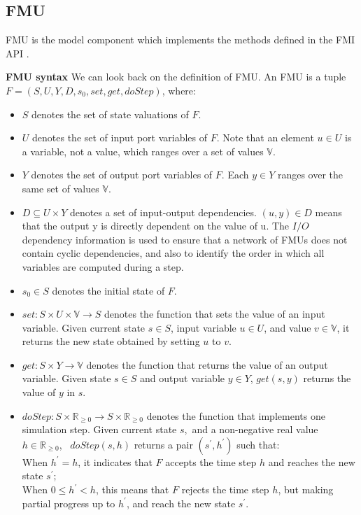 \subsection{FMU}
FMU is the model component which implements the methods defined in the FMI API \cite{Tripakis15}.
\begin{definition}
\textbf{FMU syntax}
We can look back on the definition of FMU. An FMU is a tuple $F=(S,U,Y,D,s_{0},set,get,doStep)$, where:
\end{definition}
\begin{itemize}
\item
$S$ denotes the set of state valuations of $F$. 
\item
$U$ denotes the set of input port variables of $F$. Note that an element $u \in U$ is a variable, not a value, which ranges over a set of values $\mathbb{V}$. 
\item
$Y$ denotes the set of output port variables of $F$. Each $y \in Y$ ranges over the same set of values $\mathbb{V}$.
\item
$D \subseteq U \times Y$ denotes a set of input-output dependencies. $(u,y) \in D $ means that the output y is directly dependent on the value of u. The $I/O$ dependency information is used to ensure that a network of FMUs does not contain cyclic dependencies, and also to identify the order in which all variables are computed during a step.
\item
$s_{0} \in S$ denotes the initial state of $F$.
\item
$set : S \times U \times \mathbb{V} \rightarrow S$ denotes the function that sets the value of an input variable. Given current state $s \in S$, input variable $u \in U$, and value $v \in \mathbb{V}$, it returns the new state obtained by setting $u$ to $v$.
\item
$get : S \times Y \rightarrow \mathbb{V}$ denotes the function that returns the value of an output variable. Given state $s \in S$ and output variable $y \in Y$, $get(s,y)$ returns the value of $y$ in $s$.
\item
$doStep : S \times \mathbb{R}_{\geqslant{0}} \rightarrow S \times \mathbb{R}_{\geqslant{0}}$ denotes the function that implements one simulation step. Given current state $s$,~and a non-negative real value $h \in \mathbb{R}_{\geqslant{0}}$,~    $doStep(s,h)$ returns a pair $(s^{\prime},h^{\prime})$ such that:
\\
When $h^{\prime} = h$, it indicates that $F$ accepts the time step $h$ and reaches the new state $s^{\prime}$;
\\
When $0 \leqslant h^{\prime} < h$, this means that $F$ rejects the time step $h$, but making partial progress up to $h^{\prime}$, and reach the new state $s^{\prime}$.
\end{itemize}
